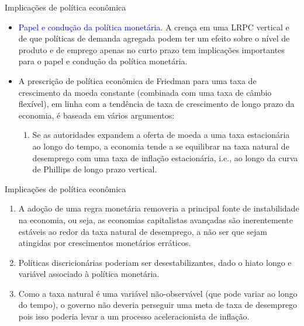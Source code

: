 \documentclass[10pt]{beamer}
\begin{document}
\begin{frame}{Implicações de política econômica}
    \begin{itemize}
        \item \textcolor{blue}{Papel e condução da política monetária}. A crença em uma LRPC vertical e de que políticas de demanda agregada podem ter um efeito sobre o nível de produto e de emprego apenas no curto prazo tem implicações importantes para o papel e condução da política monetária.
        \bigskip
        \item A prescrição de política econômica de Friedman para uma taxa de crescimento da moeda constante (combinada com uma taxa de câmbio flexível), em linha com a tendência de taxa de crescimento de longo prazo da economia, é baseada em vários argumentos:
        \bigskip
        \begin{enumerate}
            \item Se as autoridades expandem a oferta de moeda a uma taxa estacionária ao longo do tempo, a economia tende a se equilibrar na taxa natural de desemprego com uma taxa de inflação estacionária, i.e., ao longo da curva de Phillips de longo prazo vertical.
        \end{enumerate}
    \end{itemize}    
\end{frame}

\begin{frame}{Implicações de política econômica}
    \begin{itemize}
        \begin{enumerate}            
            \item A adoção de uma regra monetária removeria a principal fonte de instabilidade na economia, ou seja, as economias capitalistas avançadas são inerentemente estáveis ao redor da taxa natural de desemprego, a não ser que sejam atingidas por crescimentos monetários erráticos.
            \bigskip
            \item Políticas discricionárias poderiam ser desestabilizantes, dado o hiato longo e variável associado à política monetária.
            \bigskip
            \item Como a taxa natural é uma variável não-observável (que pode variar ao longo do tempo), o governo não deveria perseguir uma meta de taxa de desemprego pois isso poderia levar a um processo aceleracionista de inflação.
        \end{enumerate}
    \end{itemize}    
\end{frame}
\end{document}
